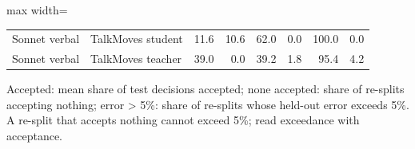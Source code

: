 \begin{table}[t]
\begin{adjustbox}{max width=\linewidth}
\begin{tabular}{llrrrrrr}
Sonnet verbal & TalkMoves student & 11.6 & 10.6 & 62.0 & 0.0 & 100.0 & 0.0 \\
Sonnet verbal & TalkMoves teacher & 39.0 & 0.0 & 39.2 & 1.8 & 95.4 & 4.2 \\
\bottomrule
\end{tabular}
\end{adjustbox}
\par\smallskip\footnotesize\raggedright Accepted: mean share of test decisions accepted; none accepted: share of re-splits accepting nothing; error > 5\%: share of re-splits whose held-out error exceeds 5\%. A re-split that accepts nothing cannot exceed 5\%; read exceedance with acceptance.
\end{table}
